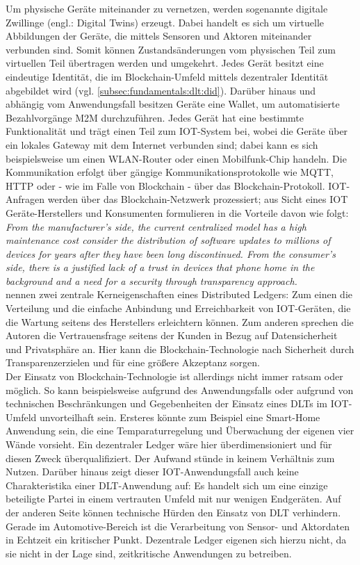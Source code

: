 Um physische Geräte miteinander zu vernetzen, werden sogenannte digitale Zwillinge (engl.: Digital Twins) erzeugt. Dabei handelt es sich um virtuelle Abbildungen der Geräte, die mittels Sensoren und Aktoren miteinander verbunden sind. Somit können Zustandsänderungen vom physischen Teil zum virtuellen Teil übertragen werden und umgekehrt. Jedes Gerät besitzt eine eindeutige Identität, die im Blockchain-Umfeld mittels dezentraler Identität abgebildet wird (vgl. \ref{subsec:fundamentals:dlt:did}). Darüber hinaus und abhängig vom Anwendungsfall besitzen Geräte eine Wallet, um automatisierte Bezahlvorgänge \ac{M2M} durchzuführen. Jedes Gerät hat eine bestimmte Funktionalität und trägt einen Teil zum \ac{IOT}-System bei, wobei die Geräte über ein lokales Gateway mit dem Internet verbunden sind; dabei kann es sich beispielsweise um einen WLAN-Router oder einen Mobilfunk-Chip handeln. Die Kommunikation erfolgt über gängige Kommunikationsprotokolle wie MQTT, HTTP oder - wie im Falle von Blockchain - über das Blockchain-Protokoll. \ac{IOT}-Anfragen werden über das Blockchain-Netzwerk prozessiert; aus Sicht eines \ac{IOT} Geräte-Herstellers und Konsumenten formulieren \citeauthor{SCIOT2016} in \cite{SCIOT2016} die Vorteile davon wie folgt:\\
\textit{\glqq From the manufacturer's side, the current centralized model has a high maintenance cost consider the distribution of software updates to millions of devices for years after they have been long discontinued. From the consumer's side, there is a justified lack of a trust in devices that phone home in the background and a need for a security through transparency approach.\grqq}\\
\citeauthor{SCIOT2016} nennen zwei zentrale Kerneigenschaften eines Distributed Ledgers: Zum einen die Verteilung und die einfache Anbindung und Erreichbarkeit von \ac{IOT}-Geräten, die die Wartung seitens des Herstellers erleichtern können. Zum anderen sprechen die Autoren die Vertrauensfrage seitens der Kunden in Bezug auf Datensicherheit und Privatsphäre an. Hier kann die Blockchain-Technologie nach \citeauthor{SCIOT2016} \glqq Sicherheit durch Transparenz\grqq erzielen und für eine größere Akzeptanz sorgen.\\
Der Einsatz von Blockchain-Technologie ist allerdings nicht immer ratsam oder möglich. So kann beispielsweise aufgrund des Anwendungsfalls oder aufgrund von technischen Beschränkungen und Gegebenheiten der Einsatz eines \acp{DLT} im \ac{IOT}-Umfeld unvorteilhaft sein. Ersteres könnte zum Beispiel eine Smart-Home Anwendung sein, die eine Temparaturregelung und Überwachung der eigenen vier Wände vorsieht. Ein dezentraler Ledger wäre hier überdimensioniert und für diesen Zweck überqualifiziert. Der Aufwand stünde in keinem Verhältnis zum Nutzen. Darüber hinaus zeigt dieser \ac{IOT}-Anwendungsfall auch keine Charakteristika einer \ac{DLT}-Anwendung auf: Es handelt sich um eine einzige beteiligte Partei in einem vertrauten Umfeld mit nur wenigen Endgeräten. Auf der anderen Seite können technische Hürden den Einsatz von \ac{DLT} verhindern. Gerade im Automotive-Bereich ist die Verarbeitung von Sensor- und Aktordaten in Echtzeit ein kritischer Punkt. Dezentrale Ledger eigenen sich hierzu nicht, da sie nicht in der Lage sind, zeitkritische Anwendungen zu betreiben.\\
